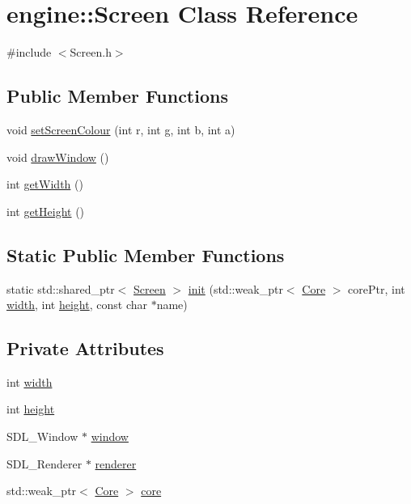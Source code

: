 \hypertarget{classengine_1_1_screen}{}\section{engine\+:\+:Screen Class Reference}
\label{classengine_1_1_screen}


{\ttfamily \#include $<$Screen.\+h$>$}

\subsection*{Public Member Functions}
\begin{DoxyCompactItemize}
\item 
void \mbox{\hyperlink{classengine_1_1_screen_a43f6d5b65f4b07dc4354732d290ba67a}{set\+Screen\+Colour}} (int r, int g, int b, int a)
\item 
void \mbox{\hyperlink{classengine_1_1_screen_a96423ea3424efa23037ecae01e4e0953}{draw\+Window}} ()
\item 
int \mbox{\hyperlink{classengine_1_1_screen_a0fd48117427d94314f2cbcd1cba09878}{get\+Width}} ()
\item 
int \mbox{\hyperlink{classengine_1_1_screen_ab183de0c976799b704adb5f95620f78e}{get\+Height}} ()
\end{DoxyCompactItemize}
\subsection*{Static Public Member Functions}
\begin{DoxyCompactItemize}
\item 
static std\+::shared\+\_\+ptr$<$ \mbox{\hyperlink{classengine_1_1_screen}{Screen}} $>$ \mbox{\hyperlink{classengine_1_1_screen_a23c3c7d3693189569cd9a514a48367fa}{init}} (std\+::weak\+\_\+ptr$<$ \mbox{\hyperlink{classengine_1_1_core}{Core}} $>$ core\+Ptr, int \mbox{\hyperlink{classengine_1_1_screen_ad852df05bf71412c8d89a5b5cebbc558}{width}}, int \mbox{\hyperlink{classengine_1_1_screen_a37b0b2dbbce5369e8eca7d11068681e8}{height}}, const char $\ast$name)
\end{DoxyCompactItemize}
\subsection*{Private Attributes}
\begin{DoxyCompactItemize}
\item 
int \mbox{\hyperlink{classengine_1_1_screen_ad852df05bf71412c8d89a5b5cebbc558}{width}}
\item 
int \mbox{\hyperlink{classengine_1_1_screen_a37b0b2dbbce5369e8eca7d11068681e8}{height}}
\item 
S\+D\+L\+\_\+\+Window $\ast$ \mbox{\hyperlink{classengine_1_1_screen_a68b990377d88e0419ca47eb09d17524b}{window}}
\item 
S\+D\+L\+\_\+\+Renderer $\ast$ \mbox{\hyperlink{classengine_1_1_screen_a0d7f4947ebbeb49a841ee6a4d3cbdb19}{renderer}}
\item 
std\+::weak\+\_\+ptr$<$ \mbox{\hyperlink{classengine_1_1_core}{Core}} $>$ \mbox{\hyperlink{classengine_1_1_screen_ae27fce6edba72dcb68491e2e3708b133}{core}}
\end{DoxyCompactItemize}


